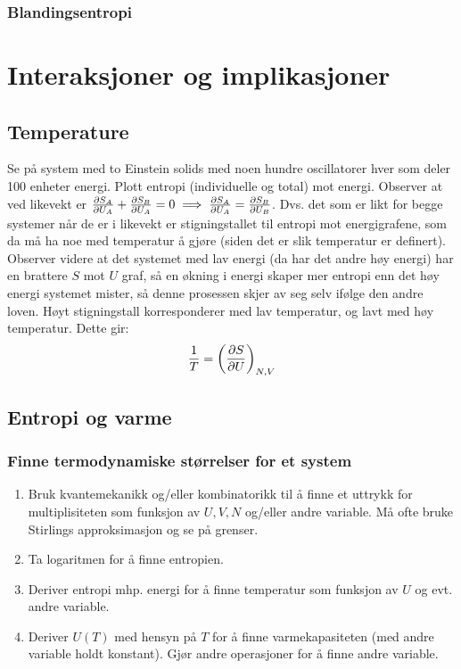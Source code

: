 \documentclass[12pt]{article}
\begin{document}
\subsubsection{Blandingsentropi}
\section{Interaksjoner og implikasjoner}
\subsection{Temperature}
Se på system med to Einstein solids med noen hundre oscillatorer hver som deler
100 enheter energi. Plott entropi (individuelle og total) mot energi. Observer at
ved likevekt er $\pdv{S_A}{U_A} + \pdv{S_B}{U_A} = 0 \implies \pdv{S_A}{U_A} = \pdv{S_B}{U_B}$.
Dvs. det som er likt for begge systemer når de er i likevekt er stigningstallet til
entropi mot energigrafene, som da må ha noe med temperatur å gjøre (siden det er slik
temperatur er definert). Observer videre at det systemet med lav energi (da har det andre høy energi)
har en brattere $S$ mot $U$ graf, så en økning i energi skaper mer entropi enn det
høy energi systemet mister, så denne prosessen skjer av seg selv ifølge den andre loven.
Høyt stigningstall korresponderer med lav temperatur, og lavt med høy temperatur. Dette gir:
\begin{align*}
  \frac{1}{T} = \left(\pdv{S}{U} \right)_{N,V}
\end{align*}
\subsection{Entropi og varme}
\subsubsection{Finne termodynamiske størrelser for et system}
\begin{enumerate}
  \itemsep0em
  \item Bruk kvantemekanikk og/eller kombinatorikk til å finne et uttrykk for
  multiplisiteten som funksjon av $U,V,N$ og/eller andre variable. Må ofte bruke
  Stirlings approksimasjon og se på grenser.
  \item Ta logaritmen for å finne entropien.
  \item Deriver entropi mhp. energi for å finne temperatur som funksjon av $U$
  og evt. andre variable.
  \item Deriver $U(T)$ med hensyn på $T$ for å finne varmekapasiteten (med andre
  variable holdt konstant). Gjør andre operasjoner for å finne andre variable.
\end{enumerate}
\end{document}
